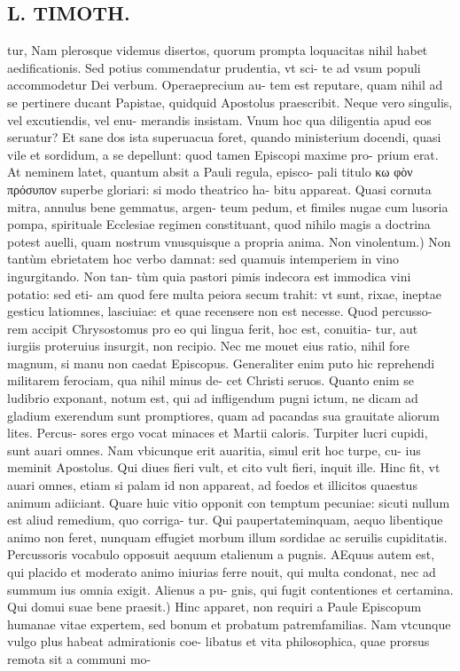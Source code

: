 \documentclass{article}
\begin{document}
\begin{pages}
\section*{L. TIMOTH. }
\marginpar{[ p.34 ]}\pstart tur, Nam plerosque videmus disertos, quorum prompta loquacitas nihil habet aedificationis. Sed potius commendatur prudentia, vt sci- te ad vsum populi accommodetur Dei verbum. Operaeprecium au- tem est reputare, quam nihil ad se pertinere ducant Papistae, quidquid Apostolus praescribit. Neque vero singulis, vel excutiendis, vel enu- merandis insistam. Vnum hoc qua diligentia apud eos seruatur? Et sane dos ista superuacua foret, quando ministerium docendi, quasi vile et sordidum, a se depellunt: quod tamen Episcopi maxime pro- prium erat. At neminem latet, quantum absit a Pauli regula, episco- pali titulo κω φὸν πρόσυπον superbe gloriari: si modo theatrico ha- bitu appareat. Quasi cornuta mitra, annulus bene gemmatus, argen- teum pedum, et fimiles nugae cum lusoria pompa, spirituale Ecclesiae regimen constituant, quod nihilo magis a doctrina potest auelli, quam nostrum vnusquisque a propria anima.  \pend\pstart Non vinolentum.) Non tantùm ebrietatem hoc verbo damnat: sed quamuis intemperiem in vino ingurgitando. Non tan- tùm quia pastori pimis indecora est immodica vini potatio: sed eti- am quod fere multa peiora secum trahit: vt sunt, rixae, ineptae gesticu latiomnes, lasciuiae: et quae recensere non est necesse. Quod percusso- rem accipit Chrysostomus pro eo qui lingua ferit, hoc est, conuitia- tur, aut iurgiis proteruius insurgit, non recipio. Nec me mouet eius ratio, nihil fore magnum, si manu non caedat Episcopus. Generaliter enim puto hic reprehendi militarem ferociam, qua nihil minus de- cet Christi seruos. Quanto enim se ludibrio exponant, notum est, qui ad infligendum pugni ictum, ne dicam ad gladium exerendum sunt promptiores, quam ad pacandas sua grauitate aliorum lites. Percus- sores ergo vocat minaces et Martii caloris. Turpiter lucri cupidi, sunt auari omnes. Nam vbicunque erit auaritia, simul erit hoc turpe, cu- ius meminit Apostolus. Qui diues fieri vult, et cito vult fieri, inquit ille. Hinc fit, vt auari omnes, etiam si palam id non appareat, ad foedos et illicitos quaestus animum adiiciant. Quare huic vitio opponit con temptum pecuniae: sicuti nullum est aliud remedium, quo corriga- tur. Qui paupertateminquam, aequo libentique animo non feret, nunquam effugiet morbum illum sordidae ac seruilis cupiditatis. Percussoris vocabulo opposuit aequum etalienum a pugnis. AEquus autem est, qui placido et moderato animo iniurias ferre nouit, qui multa condonat, nec ad summum ius omnia exigit. Alienus a pu- gnis, qui fugit contentiones et certamina.  \pend\pstart Qui domui suae bene praesit.) Hinc apparet, non requiri a Paule Episcopum humanae vitae expertem, sed bonum et probatum patremfamilias. Nam vtcunque vulgo plus habeat admirationis coe- libatus et vita philosophica, quae prorsus remota sit a communi mo-  \pend

\end{pages}
\end{document}
